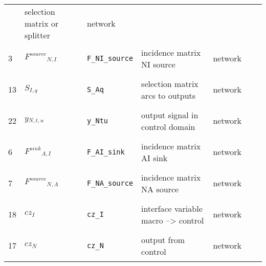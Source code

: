 \begin{longtable}{|p{1cm}|p{2.5cm}|p{4.5cm}|p{8cm}|p{3.0cm}|p{3cm}|p{1cm}|}
             & selection matrix or splitter
             & \begin{lay}network \end{lay}
             & $  $
             & \\
            3
             & \hypertarget{"v:3"}{ $ {{F^{source}}}{_{N, I}} $}
             & \verb|F_NI_source|
             & incidence matrix NI source
             & \begin{lay}network \end{lay}
             & $  $
             & \\
            13
             & \hypertarget{"v:13"}{ $ {{S}}{_{I, q}} $}
             & \verb|S_Aq|
             & selection matrix arcs to outputs
             & \begin{lay}network \end{lay}
             & $  $
             & \\
            22
             & \hypertarget{"v:22"}{ $ {{y}}{_{N, t, u}} $}
             & \verb|y_Ntu|
             & output signal in control domain
             & \begin{lay}network \end{lay}
             & $  $
             & \\
            6
             & \hypertarget{"v:6"}{ $ {{F^{sink}}}{_{A, I}} $}
             & \verb|F_AI_sink|
             & incidence matrix AI sink
             & \begin{lay}network \end{lay}
             & $  $
             & \\
            7
             & \hypertarget{"v:7"}{ $ {{F^{source}}}{_{N, A}} $}
             & \verb|F_NA_source|
             & incidence matrix NA source
             & \begin{lay}network \end{lay}
             & $  $
             & \\
            18
             & \hypertarget{"v:18"}{ $ {{cz}}{_{I}} $}
             & \verb|cz_I|
             & interface variable macro --> control
             & \begin{lay}network \end{lay}
             & $  $
             & \\
            17
             & \hypertarget{"v:17"}{ $ {{cz}}{_{N}} $}
             & \verb|cz_N|
             & output from control
             & \begin{lay}network \end{lay}

\end{longtable}
